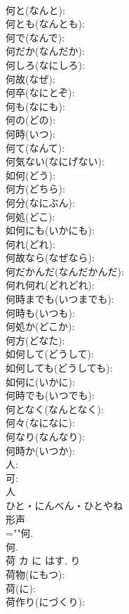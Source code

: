 \documentclass[8pt]{extreport}
\begin{document}
\begin{CJK}{UTF8}{min}
\\	何と(なんと): 
\\	何とも(なんとも): 
\\	何で(なんで): 
\\	何だか(なんだか): 
\\	何しろ(なにしろ): 
\\	何故(なぜ): 
\\	何卒(なにとぞ): 
\\	何も(なにも): 
\\	何の(どの): 
\\	何時(いつ): 
\\	何て(なんて): 
\\	何気ない(なにげない): 
\\	如何(どう): 
\\	何方(どちら): 
\\	何分(なにぶん): 
\\	何処(どこ): 
\\	如何にも(いかにも): 
\\	何れ(どれ): 
\\	何故なら(なぜなら): 
\\	何だかんだ(なんだかんだ): 
\\	何れ何れ(どれどれ): 
\\	何時までも(いつまでも): 
\\	何時も(いつも): 
\\	何処か(どこか): 
\\	何方(どなた): 
\\	如何して(どうして): 
\\	如何しても(どうしても): 
\\	如何に(いかに): 
\\	何時でも(いつでも): 
\\	何となく(なんとなく): 
\\	何々(なになに): 
\\	何なり(なんなり): 
\\	何時か(いつか): 
\\	人: 
\\	可: 
\\	人	
\\	ひと・にんべん・ひとやね	
\\	形声 
\\	=""何.
\\	何.
\\	荷	カ	に	はす, り	
\\	荷物(にもつ): 
\\	荷(に): 
\\	荷作り(にづくり): 

\end{CJK}
\end{document}
